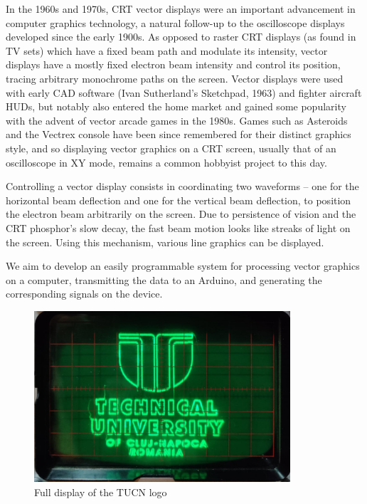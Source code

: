 \documentclass[12pt]{article}
\begin{document}
In the 1960s and 1970s, CRT vector displays were an important advancement in computer graphics technology, a natural follow-up to the oscilloscope displays developed since the early 1900s. As opposed to raster CRT displays (as found in TV sets) which have a fixed beam path and modulate its intensity, vector displays have a mostly fixed electron beam intensity and control its position, tracing arbitrary monochrome paths on the screen. Vector displays were used with early CAD software (Ivan Sutherland's Sketchpad, 1963) and fighter aircraft HUDs, but notably also entered the home market and gained some popularity with the advent of vector arcade games in the 1980s. Games such as Asteroids and the Vectrex console have been since remembered for their distinct graphics style, and so displaying vector graphics on a CRT screen, usually that of an oscilloscope in XY mode, remains a common hobbyist project to this day.

Controlling a vector display consists in coordinating two waveforms -- one for the horizontal beam deflection and one for the vertical beam deflection, to position the electron beam arbitrarily on the screen. Due to persistence of vision and the CRT phosphor's slow decay, the fast beam motion looks like streaks of light on the screen. Using this mechanism, various line graphics can be displayed.

We aim to develop an easily programmable system for processing vector graphics on a computer, transmitting the data to an Arduino, and generating the corresponding signals on the device. 

\newpage
\begin{figure}[h]
\centering
\includegraphics[width=0.85\textwidth]{images/demo-tucn.png}
\caption{Full display of the TUCN logo}
\label{fig:tucn-full}
\end{figure}
\end{document}
